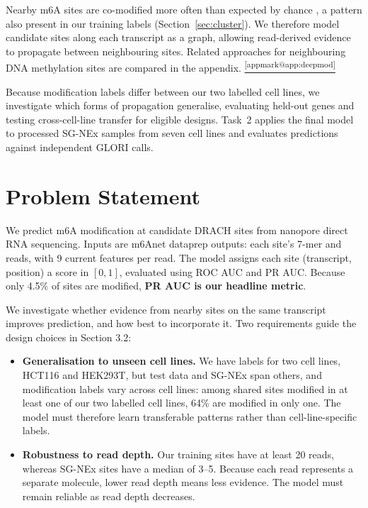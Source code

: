 \documentclass[11pt,a4paper]{article}
\makeatletter
\DeclareRobustCommand{\applink}[1]{%
    \hyperref[#1]{\textsuperscript{\ref*{appmark@#1}}}}
\makeatother
\begin{document}
Nearby m6A sites are co-modified more often than expected
by chance \citep{m6aiso2025,kang2025}, a pattern also present
in our training labels (Section~\ref{sec:cluster}). We therefore
model candidate sites along each transcript as a graph,
allowing read-derived evidence to propagate between
neighbouring sites. Related approaches for neighbouring DNA methylation sites
are compared in the appendix.\applink{app:deepmod}

Because modification labels differ between our two labelled cell lines, we
investigate which forms of propagation generalise, evaluating held-out genes and testing cross-cell-line
transfer for eligible designs. Task~2 applies the final model to processed SG-NEx samples from seven
cell lines and evaluates predictions against independent GLORI calls.

\section{Problem Statement}

We predict m6A modification at candidate DRACH sites from nanopore direct
RNA sequencing. Inputs are m6Anet dataprep outputs: each site's 7-mer and
reads, with 9 current features per read. The model assigns each site
(transcript, position) a score in $[0,1]$, evaluated using ROC AUC and PR
AUC. Because only 4.5\% of sites are modified, \textbf{PR AUC is our headline
metric}.

We investigate whether evidence from nearby sites on the same transcript
improves prediction, and how best to incorporate it. Two requirements guide
the design choices in Section 3.2:
\begin{itemize}
    \item \textbf{Generalisation to unseen cell lines.} We have labels for two
    cell lines, HCT116 and HEK293T, but test data and SG-NEx span others, and
    modification labels vary across cell lines: among shared sites modified in
    at least one of our two labelled cell lines, 64\% are modified in only one. 
    The model must therefore learn transferable patterns rather than 
    cell-line-specific labels.
    \item \textbf{Robustness to read depth.} Our training sites have at least 20 
    reads, whereas SG-NEx sites have a median of 3--5. Because each read 
    represents a separate molecule, lower read depth means less evidence. The 
    model must remain reliable as read depth decreases.
\end{itemize}
\end{document}
